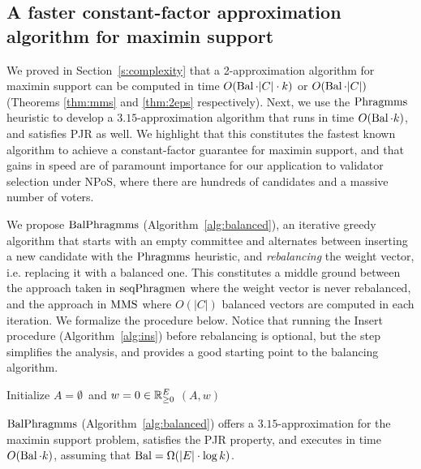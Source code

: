 \subsection{A faster constant-factor approximation algorithm for maximin support}\label{s:315}

We proved in Section~\ref{s:complexity} that a 2-approximation algorithm for maximin support can be computed in time $O(\operatorname{Bal}\cdot |C|\cdot k)$ or $O(\operatorname{Bal}\cdot |C|)$ (Theorems \ref{thm:mms} and \ref{thm:2eps} respectively). 
Next, we use the $\operatorname{Phragmms}$ heuristic to develop a $3.15$-approximation algorithm that runs in time $O(\operatorname{Bal}\cdot k)$, and satisfies PJR as well. We highlight that this constitutes the fastest known algorithm to achieve a constant-factor guarantee for maximin support, and that gains in speed are of paramount importance for our application to validator selection under NPoS, where there are hundreds of candidates and a massive number of voters.

We propose $\balanced$ (Algorithm~\ref{alg:balanced}), an iterative greedy algorithm that starts with an empty committee and alternates between inserting a new candidate with the $\operatorname{Phragmms}$ heuristic, and \emph{rebalancing} the weight vector, i.e. replacing it with a balanced one. This constitutes a middle ground between the approach taken in $\operatorname{seqPhragmen}$ where the weight vector is never rebalanced, and the approach in $\operatorname{MMS}$ where $O(|C|)$ balanced vectors are computed in each iteration. 
We formalize the procedure below. Notice that running the Insert procedure (Algorithm~\ref{alg:ins}) before rebalancing is optional, but the step simplifies the analysis, and provides a good starting point to the balancing algorithm.

\begin{algorithm}[htb]\label{alg:balanced}
\SetAlgoLined
{}
Initialize $A=\emptyset$\ and $w=0\in\mathbb{R}_{\geq 0}^E$\;
\Return $(A,w)$\;
\caption{$\balanced$}
\end{algorithm}

\begin{theorem}\label{thm:315}
$\balanced$ (Algorithm~\ref{alg:balanced}) offers a $3.15$-approximation for the maximin support problem, satisfies the PJR property, and executes in time $O(\operatorname{Bal}\cdot k)$, assuming that $\operatorname{Bal}= \Omega(|E|\cdot \log k)$.
\end{theorem}

